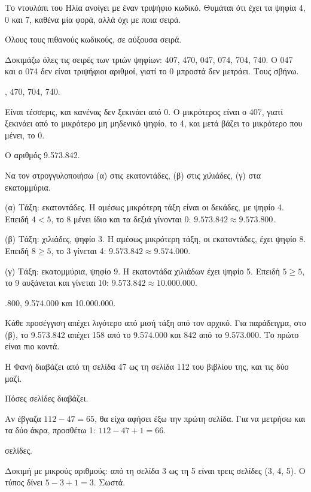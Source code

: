 
\tixero Το ντουλάπι του Ηλία ανοίγει με έναν τριψήφιο κωδικό. Θυμάται ότι έχει τα ψηφία 4, 0 και 7, καθένα μία φορά, αλλά όχι με ποια σειρά.\par
\tithelo Όλους τους πιθανούς κωδικούς, σε αύξουσα σειρά.\par
\possindeo Δοκιμάζω όλες τις σειρές των τριών ψηφίων: 407, 470, 047, 074, 704, 740. Ο 047 και ο 074 δεν είναι τριψήφιοι αριθμοί, γιατί το 0 μπροστά δεν μετράει. Τους σβήνω.\par
{}, 470, 704, 740.\par
\elegxos Είναι τέσσερις, και κανένας δεν ξεκινάει από 0. Ο μικρότερος είναι ο 407, γιατί ξεκινάει από το μικρότερο μη μηδενικό ψηφίο, το 4, και μετά βάζει το μικρότερο που μένει, το 0.

\tixero Ο αριθμός 9.573.842.\par
\tithelo Να τον στρογγυλοποιήσω (α) στις εκατοντάδες, (β) στις χιλιάδες, (γ) στα εκατομμύρια.\par
\possindeo
(α) Τάξη: εκατοντάδες. Η αμέσως μικρότερη τάξη είναι οι δεκάδες, με ψηφίο 4. Επειδή $4<5$, το 8 μένει ίδιο και τα δεξιά γίνονται 0: $9.573.842\approx 9.573.800$.\par
(β) Τάξη: χιλιάδες, ψηφίο 3. Η αμέσως μικρότερη τάξη, οι εκατοντάδες, έχει ψηφίο 8. Επειδή $8\ge 5$, το 3 γίνεται 4: $9.573.842\approx 9.574.000$.\par
(γ) Τάξη: εκατομμύρια, ψηφίο 9. Η εκατοντάδα χιλιάδων έχει ψηφίο 5. Επειδή $5\ge 5$, το 9 αυξάνεται και γίνεται 10: $9.573.842\approx 10.000.000$.\par
{}.800, 9.574.000 και 10.000.000.\par
\elegxos Κάθε προσέγγιση απέχει λιγότερο από μισή τάξη από τον αρχικό. Για παράδειγμα, στο (β), το 9.573.842 απέχει 158 από το 9.574.000 και 842 από το 9.573.000. Το πρώτο είναι πιο κοντά.

\tixero Η Φανή διαβάζει από τη σελίδα 47 ως τη σελίδα 112 του βιβλίου της, και τις δύο μαζί.\par
\tithelo Πόσες σελίδες διαβάζει.\par
\possindeo Αν έβγαζα $112-47=65$, θα είχα αφήσει έξω την πρώτη σελίδα. Για να μετρήσω και τα δύο άκρα, προσθέτω 1: $112-47+1=66$.\par
{} σελίδες.\par
\elegxos Δοκιμή με μικρούς αριθμούς: από τη σελίδα 3 ως τη 5 είναι τρεις σελίδες (3, 4, 5). Ο τύπος δίνει $5-3+1=3$. Σωστά.

